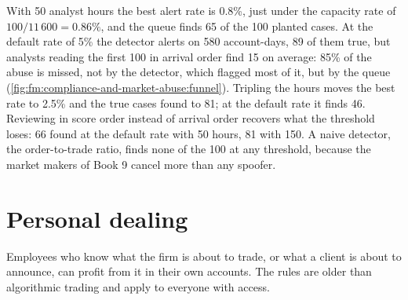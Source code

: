 With 50 analyst hours the best alert rate is 0.8\%, just under the capacity rate of $100/11\,600=0.86\%$, and the queue finds 65 of the 100
planted cases. At the default rate of 5\% the detector alerts on 580 account-days, 89 of them true, but analysts reading the first 100 in arrival
order find 15 on average: 85\% of the abuse is missed, not by the detector, which flagged most of it, but by the queue
(\cref{fig:fm:compliance-and-market-abuse:funnel}). Tripling the hours moves the best rate to 2.5\% and the true cases found to 81; at the default
rate it finds 46. Reviewing in score order instead of arrival order recovers what the threshold loses: 66 found at the default rate with 50 hours,
81 with 150. A naive detector, the order-to-trade ratio, finds none of the 100 at any threshold, because the market makers of Book 9 cancel more
than any spoofer.

\begin{omfigure}

\label{fig:fm:compliance-and-market-abuse:funnel}
\end{omfigure}

\section{Personal dealing}

Employees who know what the firm is about to trade, or what a client is about to announce, can profit from it in their own accounts. The rules are
older than algorithmic trading and apply to everyone with access.


